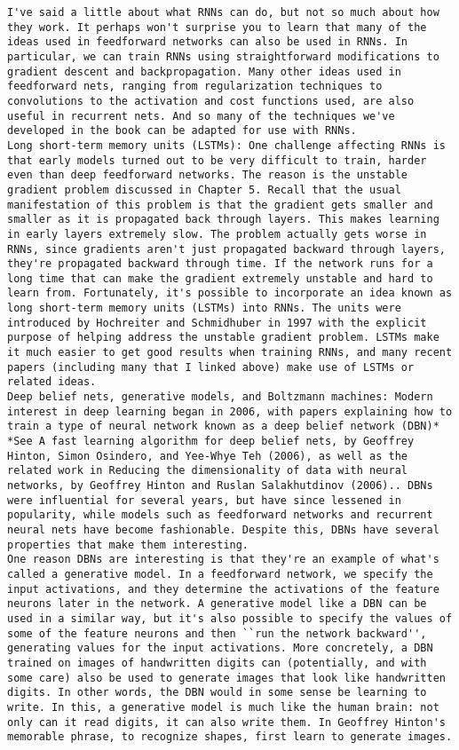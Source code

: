 \begin{lstlisting}
I've said a little about what RNNs can do, but not so much about how they work. It perhaps won't surprise you to learn that many of the ideas used in feedforward networks can also be used in RNNs. In particular, we can train RNNs using straightforward modifications to gradient descent and backpropagation. Many other ideas used in feedforward nets, ranging from regularization techniques to convolutions to the activation and cost functions used, are also useful in recurrent nets. And so many of the techniques we've developed in the book can be adapted for use with RNNs.
Long short-term memory units (LSTMs): One challenge affecting RNNs is that early models turned out to be very difficult to train, harder even than deep feedforward networks. The reason is the unstable gradient problem discussed in Chapter 5. Recall that the usual manifestation of this problem is that the gradient gets smaller and smaller as it is propagated back through layers. This makes learning in early layers extremely slow. The problem actually gets worse in RNNs, since gradients aren't just propagated backward through layers, they're propagated backward through time. If the network runs for a long time that can make the gradient extremely unstable and hard to learn from. Fortunately, it's possible to incorporate an idea known as long short-term memory units (LSTMs) into RNNs. The units were introduced by Hochreiter and Schmidhuber in 1997 with the explicit purpose of helping address the unstable gradient problem. LSTMs make it much easier to get good results when training RNNs, and many recent papers (including many that I linked above) make use of LSTMs or related ideas.
Deep belief nets, generative models, and Boltzmann machines: Modern interest in deep learning began in 2006, with papers explaining how to train a type of neural network known as a deep belief network (DBN)* *See A fast learning algorithm for deep belief nets, by Geoffrey Hinton, Simon Osindero, and Yee-Whye Teh (2006), as well as the related work in Reducing the dimensionality of data with neural networks, by Geoffrey Hinton and Ruslan Salakhutdinov (2006).. DBNs were influential for several years, but have since lessened in popularity, while models such as feedforward networks and recurrent neural nets have become fashionable. Despite this, DBNs have several properties that make them interesting.
One reason DBNs are interesting is that they're an example of what's called a generative model. In a feedforward network, we specify the input activations, and they determine the activations of the feature neurons later in the network. A generative model like a DBN can be used in a similar way, but it's also possible to specify the values of some of the feature neurons and then ``run the network backward'', generating values for the input activations. More concretely, a DBN trained on images of handwritten digits can (potentially, and with some care) also be used to generate images that look like handwritten digits. In other words, the DBN would in some sense be learning to write. In this, a generative model is much like the human brain: not only can it read digits, it can also write them. In Geoffrey Hinton's memorable phrase, to recognize shapes, first learn to generate images.

\end{lstlisting}

